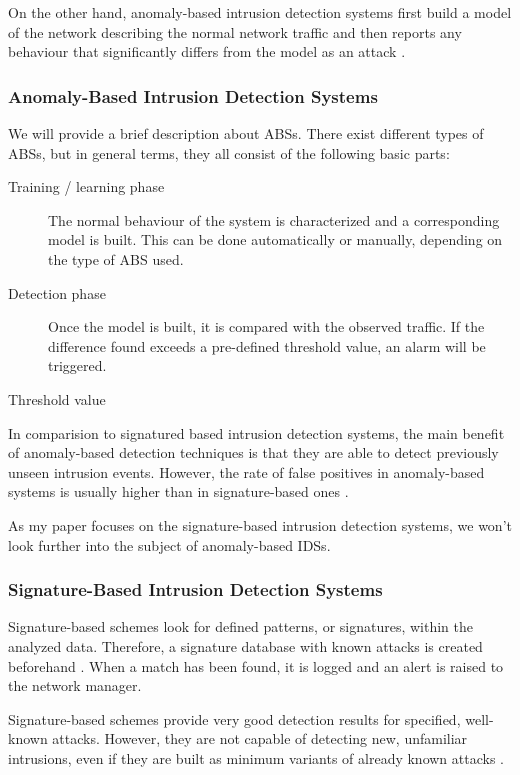 On the other hand, anomaly-based intrusion detection systems first build a model of the network describing the normal network traffic and then reports any behaviour that significantly differs from the model as an attack \citep{Roberto, windowssecurity2}.

\subsubsection{Anomaly-Based Intrusion Detection Systems}

We will provide a brief description about ABSs. There exist different types of ABSs, but in general terms, they all consist of the following basic parts:
\begin{description}
\item[Training / learning phase] The normal behaviour of the system is characterized and a corresponding model is built. This can be done automatically or manually, depending on the type of ABS used.
\item[Detection phase] Once the model is built, it is compared with the observed traffic. If the difference found exceeds a pre-defined threshold value, an alarm will be triggered.
\item[Threshold value]
\end{description}

In comparision to signatured based intrusion detection systems, the main benefit of anomaly-based detection techniques is that they are able to detect previously unseen intrusion events. However, the rate of false positives in anomaly-based systems is usually higher than in signature-based ones \citep{CandS}.

As my paper focuses on the signature-based intrusion detection systems, we won't look further into the subject of anomaly-based IDSs.

\subsubsection{Signature-Based Intrusion Detection Systems}

Signature-based schemes look for defined patterns, or signatures, within the analyzed data. Therefore, a signature database with known attacks is created beforehand \citep{CandS}. When a match has been found, it is logged and an alert is raised to the network manager.

Signature-based schemes provide very good detection results for specified, well-known attacks. However, they are not capable of detecting new, unfamiliar intrusions, even if they are built as minimum variants of already known attacks \citep{CandS}.

